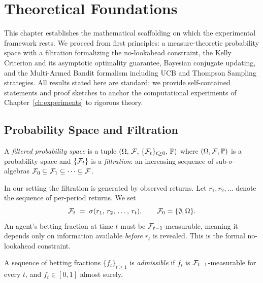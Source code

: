 \chapter{Theoretical Foundations}
\label{ch:foundations}

This chapter establishes the mathematical scaffolding on which the experimental
framework rests.  We proceed from first principles: a measure-theoretic
probability space with a filtration formalizing the no-lookahead constraint,
the Kelly Criterion and its asymptotic optimality guarantee, Bayesian conjugate
updating, and the Multi-Armed Bandit formalism including UCB and Thompson
Sampling strategies.  All results stated here are standard; we provide
self-contained statements and proof sketches to anchor the computational
experiments of Chapter~\ref{ch:experiments} to rigorous theory.

\section{Probability Space and Filtration}

\begin{definition}
\label{def:filtered_prob_space}
A \emph{filtered probability space} is a tuple
$(\Omega,\, \mathcal{F},\, \{\mathcal{F}_t\}_{t \geq 0},\, \mathbb{P})$
where $(\Omega, \mathcal{F}, \mathbb{P})$ is a probability space and $\{\mathcal{F}_t\}$ is a
\emph{filtration}: an increasing sequence of sub-$\sigma$-algebras
$\mathcal{F}_0 \subseteq \mathcal{F}_1 \subseteq \cdots \subseteq \mathcal{F}$.
\end{definition}

In our setting the filtration is generated by observed returns.  Let
$r_1, r_2, \ldots$ denote the sequence of per-period returns.  We set
\[
    \mathcal{F}_t \;=\; \sigma(r_1,\, r_2,\, \ldots,\, r_t),
    \qquad \mathcal{F}_0 = \{\emptyset, \Omega\}.
\]
An agent's betting fraction at time $t$ must be $\mathcal{F}_{t-1}$-measurable,
meaning it depends only on information available \emph{before} $r_t$ is
revealed.  This is the formal no-lookahead constraint.

\begin{definition}
\label{def:admissible}
A sequence of betting fractions $\{f_t\}_{t \geq 1}$ is \emph{admissible} if
$f_t$ is $\mathcal{F}_{t-1}$-measurable for every $t$, and $f_t \in [0,1]$
almost surely.
\end{definition}

